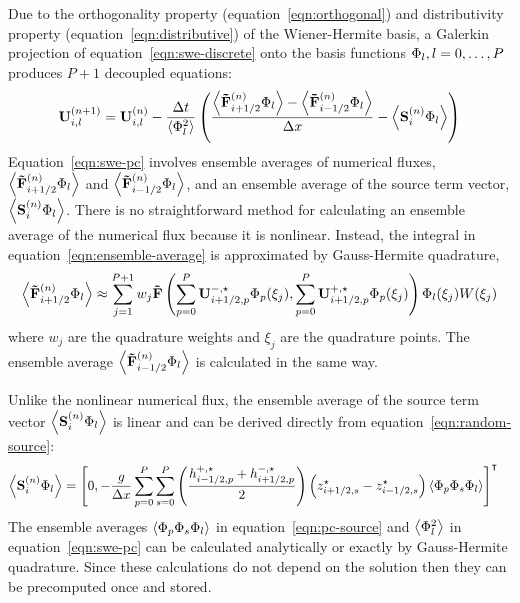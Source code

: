 Due to the orthogonality property (equation~\ref{eqn:orthogonal}) and distributivity property (equation~\ref{eqn:distributive}) of the Wiener-Hermite basis, a Galerkin projection of equation~\eqref{eqn:swe-discrete} onto the basis functions $\Phi_l, l = 0, \ldots, P$ produces $P+1$ decoupled equations:
\begin{align}
    \mathbf{U}_{i,l}^{(n+1)} = \mathbf{U}_{i,l}^{(n)}
    - \frac{\Delta t}{\left\langle \Phi_l^2 \right\rangle}
    \left(
    \frac{
    \left\langle \mathbf{\tilde{F}}_{i+1/2}^{(n)} \Phi_l \right\rangle
    -
    \left\langle \mathbf{\tilde{F}}_{i-1/2}^{(n)} \Phi_l \right\rangle
    }{\Delta x}
    - \left\langle \mathbf{S}_i^{(n)} \Phi_l \right\rangle
    \right) \label{eqn:swe-pc}
\end{align}
Equation~\eqref{eqn:swe-pc} involves ensemble averages of numerical fluxes, $\left\langle \mathbf{\tilde{F}}_{i+1/2}^{(n)} \Phi_l \right\rangle$ and $\left\langle \mathbf{\tilde{F}}_{i-1/2}^{(n)} \Phi_l \right\rangle$, and an ensemble average of the source term vector, $\left\langle \mathbf{S}_i^{(n)} \Phi_l \right\rangle$.
There is no straightforward method for calculating an ensemble average of the numerical flux because it is nonlinear.
Instead, the integral in equation~\eqref{eqn:ensemble-average} is approximated by Gauss-Hermite quadrature,
\begin{align}
    \left\langle \mathbf{\tilde{F}}_{i+1/2}^{(n)} \Phi_l \right\rangle
    \approx
    \sum_{j=1}^{P+1} w_j
    \mathbf{\tilde{F}}\left(
	\sum_{p=0}^P \mathbf{U}_{i+1/2,p}^{-,\star} \Phi_p(\xi_j),
	\sum_{p=0}^P \mathbf{U}_{i+1/2,p}^{+,\star} \Phi_p(\xi_j)
	\right)
    \Phi_l(\xi_j) W(\xi_j) \label{eqn:pc-flux}
\end{align}
where $w_j$ are the quadrature weights and $\xi_j$ are the quadrature points.
The ensemble average $\left\langle \mathbf{\tilde{F}}_{i-1/2}^{(n)} \Phi_l \right\rangle$ is calculated in the same way.

Unlike the nonlinear numerical flux, the ensemble average of the source term vector $\left\langle \mathbf{S}_i^{(n)} \Phi_l \right\rangle$ is linear and can be derived directly from equation~\eqref{eqn:random-source}:
\begin{align}
\left\langle \mathbf{S}_i^{(n)} \Phi_l \right\rangle &= \left[ 0,
    - \frac{g}{\Delta x}
    \sum_{p=0}^P \sum_{s=0}^P
\left(\frac{h^{+,\star}_{i-1/2,p} + h^{-,\star}_{i+1/2,p}}{2}\right)
\left( z^\star_{i+1/2,s} - z^\star_{i-1/2,s} \right)
    \left\langle \Phi_p \Phi_s \Phi_l \right\rangle
    \right]^\intercal
\label{eqn:pc-source}
\end{align}
The ensemble averages $\left\langle \Phi_p \Phi_s \Phi_l \right\rangle$ in equation~\eqref{eqn:pc-source} and $\left\langle \Phi_l^2 \right\rangle$ in equation~\eqref{eqn:swe-pc} can be calculated analytically or exactly by Gauss-Hermite quadrature.
Since these calculations do not depend on the solution then they can be precomputed once and stored.
